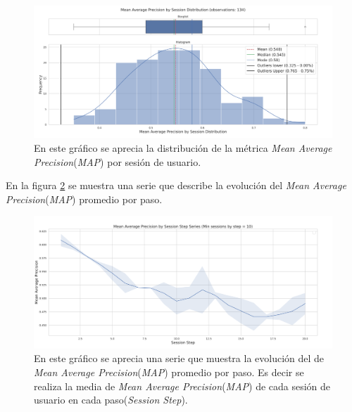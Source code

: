 \documentclass[11pt,a4paper,twoside]{thesis}
\begin{document}
\begin{figure}[H]
	\centering
	\includegraphics[width=15cm]{./images/llama2/mean_average_precision_by_session_distribution.png}
	\caption{En este gráfico se aprecia la distribución de la métrica \textit{Mean Average Precision}(\textit{MAP}) por sesión de usuario.}
	\label{fig:llama2-mean_average_precision_by_session_distribution}
\end{figure}

\clearpage

En la figura \ref{fig:llama2-mean_average_precision_by_session_step_series} se muestra una serie que describe la evolución  del \textit{Mean Average Precision}(\textit{MAP}) promedio por paso.

\begin{figure}[H]
	\centering
	\includegraphics[width=15cm]{./images/llama2/mean_average_precision_by_session_step_series.png}
	\caption{
		En este gráfico se aprecia una serie que muestra la evolución del de \textit{Mean Average Precision}(\textit{MAP}) promedio por paso. Es decir se realiza la media de \textit{Mean Average Precision}(\textit{MAP}) de cada sesión de usuario en cada paso(\textit{Session Step}).}
	\label{fig:llama2-mean_average_precision_by_session_step_series}
\end{figure}
\end{document}
